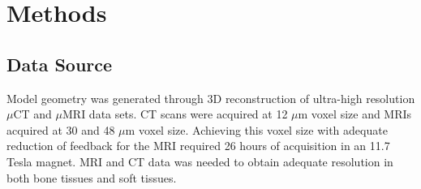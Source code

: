 \documentclass[12pt]{article}
\begin{document}



%
%
%
%
%
%
%
%
%
%
%
%




\section{Methods}
\subsection{Data Source}
Model geometry was generated through 3D reconstruction of ultra-high resolution $\mu$CT and $\mu$MRI data sets. CT scans were acquired at 12 $\mu$m voxel size and MRIs acquired at 30 and 48 $\mu$m voxel size. Achieving this voxel size with adequate reduction of feedback for the MRI required 26 hours of acquisition in an 11.7 Tesla magnet. MRI and CT data was needed to obtain adequate resolution in both bone tissues and soft tissues.
\end{document}
